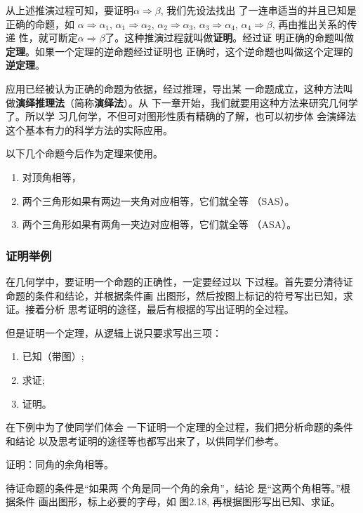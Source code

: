 从上述推演过程可知，要证明$\alpha \Rightarrow \beta$, 我们先设法找出
了一连串适当的并且已知是正确的命题，如
$\alpha \Rightarrow \alpha_1$, $\alpha_1\Rightarrow 
\alpha_2$, $\alpha_2\Rightarrow \alpha_3$, $\alpha_3\Rightarrow \alpha_4$, $\alpha_4\Rightarrow \beta$, 再由推出关系的传递
性，就可断定$\alpha \Rightarrow\beta$了。这种推演过程就叫做\textbf{证明}。经过证
明正确的命题叫做\textbf{定理}。如果一个定理的逆命题经过证明也
正确时，这个逆命题也叫做这个定理的\textbf{逆定理}。

应用已经被认为正确的命题为依据，经过推理，导出某
一命题成立，这种方法叫做\textbf{演绎推理法}（简称\textbf{演绎法}）。从
下一章开始，我们就要用这种方法来研究几何学了。所以学
习几何学，不但可对图形性质有精确的了解，也可以初步体
会演绎法这个基本有力的科学方法的实际应用。

以下几个命题今后作为定理来使用。
\begin{enumerate}
	\item 对顶角相等，
	\item 两个三角形如果有两边一夹角对应相等，它们就全等
（SAS）。
\item 两个三角形如果有两角一夹边对应相等，它们就全等
（ASA）。
\end{enumerate}

\subsubsection{证明举例}
在几何学中，要证明一个命题的正确性，一定要经过以
下过程。首先要分清待证命题的条件和结论，并根据条件画
出图形，然后按图上标记的符号写出已知，求证。接着分析
思考证明的途径，最后有根据的写出证明的全过程。

但是证明一个定理，从逻辑上说只要求写出三项：
\begin{multicols}{3}
	\begin{enumerate}
	\item 已知（带图）;
	\item 求证;
	\item 证明。
\end{enumerate}
\end{multicols}

在下例中为了使同学们体会
一下证明一个定理的全过程，我们把分析命题的条件和结论
以及思考证明的途径等也都写出来了，以供同学们参考。

\begin{example}
	证明：同角的余角相等。
	
	待证命题的条件是“如果两
个角是同一个角的余角”，结论
是“这两个角相等。”根据条件
画出图形，标上必要的字母，如
图2.18, 再根据图形写出已知、求证。
\end{example}

